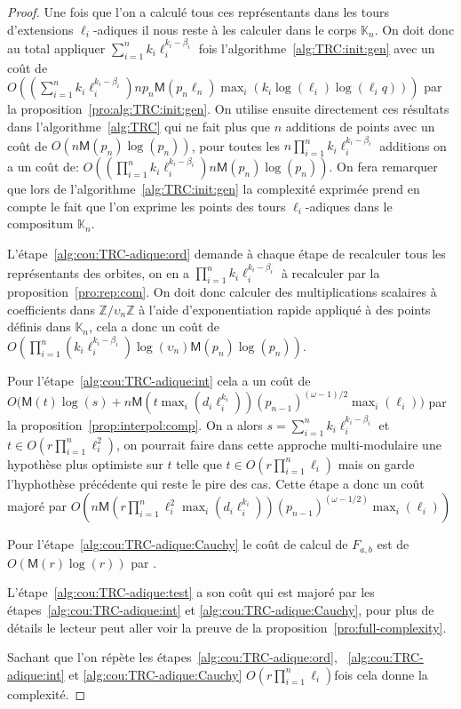 \documentclass[10pt,a4paper]{book}
\theoremstyle{plain}
\theoremstyle{definition}
\theoremstyle{definition}
\theoremstyle{definition}
\theoremstyle{definition}
\theoremstyle{remark}
\theoremstyle{remark}
\theoremstyle{definition}
\begin{document}
\begin{proof}
Une fois que l'on a calculé tous ces représentants dans les tours d'extensions
$\ell_i$-adiques il nous reste à les calculer dans le corps $\mathbb{K}_n$.
On doit donc au total appliquer $\sum_{i=1}^n k_i\ell_i^{k_i-\beta_i}$ fois 
l'algorithme~\ref{alg:TRC:init:gen} avec un coût de 
$O((\sum_{i=1}^n k_i\ell_i^{k_i-\beta_i})n p_{n}\mathsf{M}(p_{n}\ell_{n})\max_i(k_i\log(\ell_{i})\log(\ell_{i}q)))$  
par la proposition~\ref{pro:alg:TRC:init:gen}. 
On utilise ensuite directement ces résultats dans l'algorithme~\ref{alg:TRC}
qui ne fait plus que $n$ additions de points avec un coût de 
$O(n\mathsf{M}(p_n)\log(p_n))$, pour toutes les 
$n\prod_{i=1}^nk_i\ell_i^{k_i-\beta_i}$ additions on a un coût de: 
$O((\prod_{i=1}^nk_i\ell_i^{k_i-\beta_i})n\mathsf{M}(p_n)\log(p_n))$.
On fera remarquer que lors de l'algorithme~\ref{alg:TRC:init:gen} la complexité
exprimée prend en compte le fait que l'on exprime les points des tours 
$\ell_i$-adiques dans le compositum $\mathbb{K}_n$.

L'étape~\ref{alg:cou:TRC-adique:ord} demande à chaque étape de recalculer tous les 
représentants des orbites, on en a $\prod_{i=1}^n k_i\ell_i^{k_i-\beta_i}$ 
à recalculer par la proposition~\ref{pro:rep:com}. 
On doit donc calculer des multiplications scalaires à coefficients dans 
$\mathbb{Z}/\upsilon_n \mathbb{Z}$ à l'aide d'exponentiation rapide appliqué à
des points définis dans $\mathbb{K}_n$, cela a donc un coût de  
$O(\prod_{i=1}^n (k_i\ell_i^{k_i-\beta_i})\log(\upsilon_n) \mathsf{M}(p_n)\log(p_n))$.

Pour l'étape~\ref{alg:cou:TRC-adique:int} cela a un coût de 
$O\bigl(\mathsf{M}(t)\log(s) + n\mathsf{M}(t \max_i(d_i\ell_i^{k_i}))(p_{n-1})^{(\omega-1)/2} \max_{i}(\ell_{i})\bigr)$ 
 par la proposition~\ref{prop:interpol:comp}. On a alors 
 $s=\sum_{i=1}^nk_i\ell_i^{k_i-\beta_i}$ et $t \in O(r \prod_{i=1}^n\ell_i^{2})$, on 
 pourrait faire dans cette approche multi-modulaire une hypothèse plus 
 optimiste sur $t$ telle que $t \in O(r \prod_{i=1}^n\ell_i)$ mais on garde 
 l'hyphothèse précédente qui reste le pire des cas. Cette étape a donc un coût 
 majoré par 
 $O(n\mathsf{M}(r \prod_{i=1}^n \ell_i^2 \max_i(d_i \ell_i^{k_i}))(p_{n-1})^{(\omega-1/2)}\max_i(\ell_i))$

Pour l'étape~\ref{alg:cou:TRC-adique:Cauchy} le coût de calcul de $F_{a,b}$ est de 
$O(\mathsf{M}(r)\log(r))$ par \cite[Théorème 7.5]{algeff17}.

L'étape~\ref{alg:cou:TRC-adique:test} a son coût qui est majoré par les 
étapes~\ref{alg:cou:TRC-adique:int} et \ref{alg:cou:TRC-adique:Cauchy}, pour plus de 
détails le lecteur peut aller voir la preuve de la 
proposition~\ref{pro:full-complexity}.

Sachant que l'on répète les étapes~\ref{alg:cou:TRC-adique:ord}, 
~\ref{alg:cou:TRC-adique:int} et \ref{alg:cou:TRC-adique:Cauchy}  $O(r \prod_{i=1}^n\ell_i)$fois cela donne la 
complexité.
\end{proof}
\end{document}
